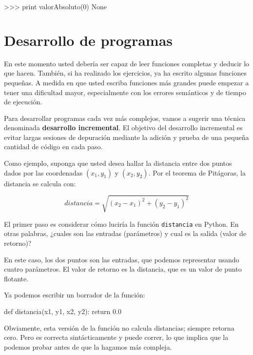 
\beforeverb
\begin{pyconcode}
>>> print valorAbsoluto(0)
None
\end{pyconcode}
\afterverb

\section{Desarrollo de programas}
\label{program development}

En este momento usted debería ser capaz de leer funciones completas
y deducir lo que hacen. También, si ha realizado los ejercicios,
ya ha escrito algunas funciones pequeñas. A medida en que usted
escriba funciones más grandes puede empezar a tener una dificultad
mayor, especialmente con los errores semánticos y de tiempo de
ejecución.

Para desarrollar programas cada vez más complejos, vamos a sugerir
una técnica denominada {\bf desarrollo incremental}.  El objetivo
del desarrollo incremental es evitar largas sesiones de depuración
mediante la adición y prueba de una pequeña cantidad de código 
en cada paso.


Como ejemplo, suponga que usted desea hallar la distancia entre
dos puntos dados por las coordenadas  $(x_1, y_1)$ y $(x_2, y_2)$.
Por el teorema de Pitágoras, la distancia se calcula con:

\begin{equation}
distancia = \sqrt{(x_2 - x_1)^2 + (y_2 - y_1)^2}
\end{equation}
%

El primer paso es considerar cómo luciría la función \texttt{distancia}
en Python. En otras palabras, ¿cuales son las entradas (parámetros)
y cual es la salida (valor de retorno)?

En este caso, los dos puntos son las entradas, que podemos representar
usando cuatro parámetros. El valor de retorno es la distancia, que es
un valor de punto flotante.

Ya podemos escribir un borrador de la función:

\beforeverb
\begin{pythoncode}
def distancia(x1, y1, x2, y2):
  return 0.0
\end{pythoncode}
\afterverb
%

Obviamente, esta versión de la función no calcula distancias; siempre
retorna cero. Pero es correcta sintácticamente  y puede correr, 
lo que implica que la podemos probar antes de que la hagamos
más compleja.

